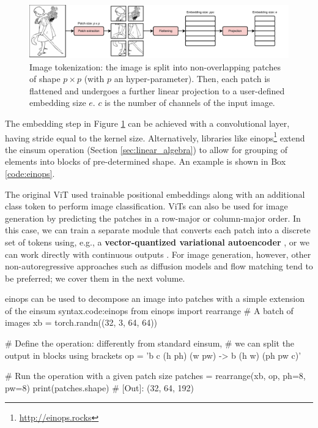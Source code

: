 \begin{figure}[t]
    \centering
    \includegraphics[width=1.0\textwidth]{images/image_tokenization}
    \caption{Image tokenization: the image is split into non-overlapping patches of shape $p \times p$ (with $p$ an hyper-parameter). Then, each patch is flattened and undergoes a further linear projection to a user-defined embedding size $e$. $c$ is the number of channels of the input image.}
    \label{fig:image_tokenization}
\end{figure}

The embedding step in Figure \ref{fig:image_tokenization} can be achieved with a convolutional layer, having stride equal to the kernel size. Alternatively, libraries like einops\footnote{\url{http://einops.rocks}} extend the einsum operation (Section \ref{sec:linear_algebra}) to allow for grouping of elements into blocks of pre-determined shape. An example is shown in Box \ref{code:einops}.

The original ViT used trainable positional embeddings along with an additional class token to perform image classification. ViTs can also be used for image generation by predicting the patches in a row-major or column-major order. In this case, we can train a separate module that converts each patch into a discrete set of tokens using, e.g., a \textbf{vector-quantized variational autoencoder} \cite{chang2022maskgit}, or we can work directly with continuous outputs \cite{tschannen2023givt}. For image generation, however, other non-autoregressive approaches such as diffusion models and flow matching tend to be preferred; we cover them in the next volume.


\begin{mypy}{einops can be used to decompose an image into patches with a simple extension of the einsum syntax.}{code:einops}
from einops import rearrange
# A batch of images
xb = torch.randn((32, 3, 64, 64)) 

# Define the operation: differently from standard einsum,
# we can split the output in blocks using brackets
op = 'b c (h ph) (w pw) -> b (h w) (ph pw c)'

# Run the operation with a given patch size
patches = rearrange(xb, op, ph=8, pw=8)
print(patches.shape) # [Out]: (32, 64, 192)
\end{mypy}

